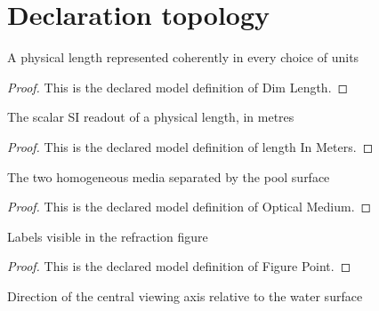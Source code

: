 \section{Declaration topology}
\begin{definition}
  \label{def:physics:phyx-mini-0042:phyxminiproblems-problemphyxmini0042-dimlength}
  A physical length represented coherently in every choice of units
\end{definition}
\begin{proof}
  This is the declared model definition of Dim Length.
\end{proof}
\begin{definition}
  \label{def:physics:phyx-mini-0042:phyxminiproblems-problemphyxmini0042-lengthinmeters}
  The scalar SI readout of a physical length, in metres
\end{definition}
\begin{proof}
  This is the declared model definition of length In Meters.
\end{proof}
\begin{definition}
  \label{def:physics:phyx-mini-0042:phyxminiproblems-problemphyxmini0042-opticalmedium}
  The two homogeneous media separated by the pool surface
\end{definition}
\begin{proof}
  This is the declared model definition of Optical Medium.
\end{proof}
\begin{definition}
  \label{def:physics:phyx-mini-0042:phyxminiproblems-problemphyxmini0042-figurepoint}
  Labels visible in the refraction figure
\end{definition}
\begin{proof}
  This is the declared model definition of Figure Point.
\end{proof}
\begin{definition}
  \label{def:physics:phyx-mini-0042:phyxminiproblems-problemphyxmini0042-viewingaxis}
  Direction of the central viewing axis relative to the water surface
\end{definition}

